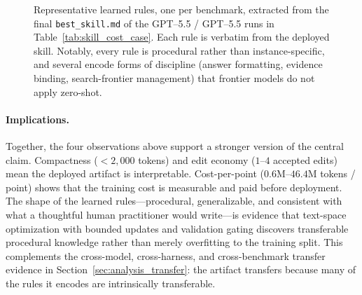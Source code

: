 \documentclass{llmxive}
\begin{document}
\begin{figure}[t]
\centering
{}
\caption{Representative learned rules, one per benchmark, extracted from the final \texttt{best\_skill.md} of the GPT--5.5 / GPT--5.5 runs in Table~\ref{tab:skill_cost_case}. Each rule is verbatim from the deployed skill. Notably, every rule is procedural rather than instance-specific, and several encode forms of discipline (answer formatting, evidence binding, search-frontier management) that frontier models do not apply zero-shot.}
\label{fig:skill_excerpts}
\end{figure}

\paragraph{Implications.}
Together, the four observations above support a stronger version of the central claim. Compactness ($<2{,}000$ tokens) and edit economy ($1$--$4$ accepted edits) mean the deployed artifact is interpretable. Cost-per-point ($0.6$M--$46.4$M tokens / point) shows that the training cost is measurable and paid before deployment. The shape of the learned rules---procedural, generalizable, and consistent with what a thoughtful human practitioner would write---is evidence that text-space optimization with bounded updates and validation gating discovers transferable procedural knowledge rather than merely overfitting to the training split. This complements the cross-model, cross-harness, and cross-benchmark transfer evidence in Section~\ref{sec:analysis_transfer}: the artifact transfers because many of the rules it encodes are intrinsically transferable.
\end{document}
